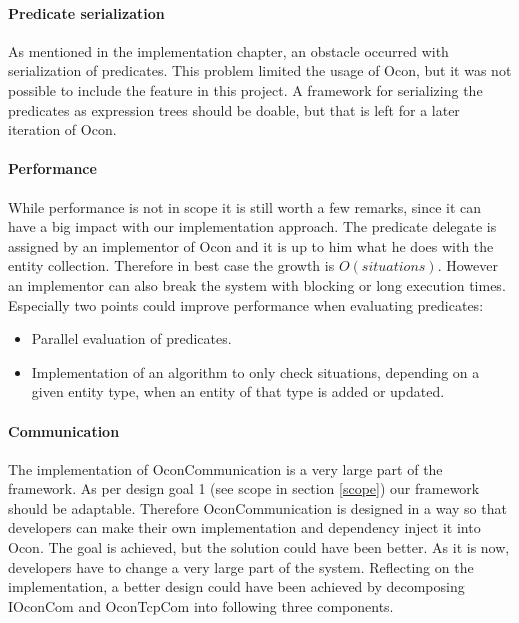 \documentclass[../report.tex]{subfiles}
\begin{document}
\graphicspath{{img/}{../img/}}

\paragraph{Predicate serialization}
As mentioned in the implementation chapter, an obstacle occurred with serialization of predicates. This problem limited the usage of Ocon, but it was not possible to include the feature in this project. A framework for serializing the predicates as expression trees should be doable, but that is left for a later iteration of Ocon.


\paragraph{Performance}

While performance is not in scope it is still worth a few remarks, since it can have a big impact with our implementation approach. The predicate delegate is assigned by an implementor of Ocon and it is up to him what he does with the entity collection. Therefore in best case the growth is $ O(situations) $. However an implementor can also break the system with blocking or long execution times. \\
Especially two points could improve performance when evaluating predicates:

\begin{itemize}
\item Parallel evaluation of predicates.
\item Implementation of an algorithm to only check situations, depending on a given entity type, when an entity of that type is added or updated.
\end{itemize}

\paragraph{Communication}
The implementation of OconCommunication is a very large part of the framework. As per design goal 1 (see scope in section \ref{scope}) our framework should be adaptable. Therefore OconCommunication is designed in a way so that developers can make their own implementation and dependency inject it into Ocon. The goal is achieved, but the solution could have been better. As it is now, developers have to change a very large part of the system. Reflecting on the implementation, a better design could have been achieved by decomposing IOconCom and OconTcpCom into following three components.
\end{document}

